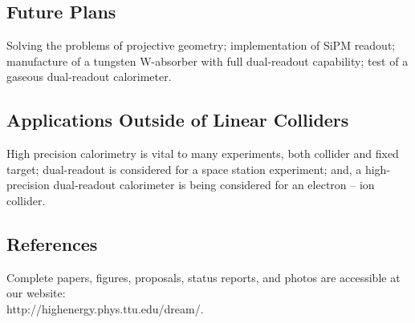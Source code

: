 \subsection{Future Plans}
Solving the problems of projective geometry; implementation of SiPM readout; manufacture of a tungsten W-absorber with full dual-readout capability; test of a gaseous dual-readout calorimeter.
\subsection{Applications Outside of Linear Colliders}
High precision calorimetry is vital to many experiments, both collider and fixed target; dual-readout is considered for a space station experiment; and, a high-precision dual-readout calorimeter is being considered for an electron -- ion collider.
\subsection{References}
Complete papers, figures, proposals, status reports, and photos are accessible at our website: \\
 http://highenergy.phys.ttu.edu/dream/.
